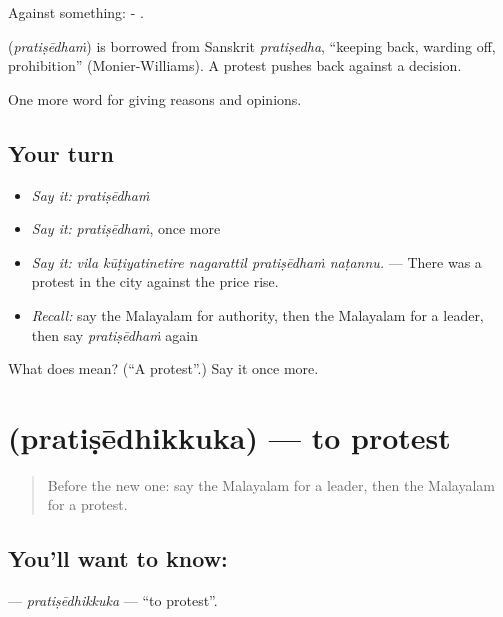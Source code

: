 Against something: -  .

\begin{cousinweb}
\textbf{} (\emph{pratiṣēdhaṁ}) is borrowed from Sanskrit \emph{pratiṣedha}, \textquotedblleft{}keeping back, warding off, prohibition\textquotedblright{} (Monier-Williams). A protest pushes back against a decision.
\end{cousinweb}

\begin{grammarlens}[title={What you've built}]
One more word for giving reasons and opinions.
\end{grammarlens}

\subsection*{Your turn}
\begin{itemize}
\raggedright
  \item \emph{Say it:} \emph{pratiṣēdhaṁ}
  \item \emph{Say it:} \emph{pratiṣēdhaṁ}, once more
  \item \emph{Say it:} \emph{vila kūṭiyatinetire nagarattil pratiṣēdhaṁ naṭannu.} — There was a protest in the city against the price rise.
  \item \emph{Recall:} say the Malayalam for authority, then the Malayalam for a leader, then say \emph{pratiṣēdhaṁ} again
\end{itemize}

\begin{tcolorbox}[breakable,colback=teal!4,colframe=teal!35!black,title={Before you move on}]
What does  mean? (\textquotedblleft{}A protest\textquotedblright{}.) Say it once more.
\end{tcolorbox}
\section[\texorpdfstring{\ml{പ്രതിഷേധിക്കുക} (pratiṣēdhikkuka)}{പ്രതിഷേധിക്കുക (pratiṣēdhikkuka)}]{ (pratiṣēdhikkuka) — to protest}

\label{lesson:ML-C425-pratisedhikkuka}



\begin{quote}
Before the new one: say the Malayalam for a leader, then the Malayalam for a protest.
\end{quote}

\subsection*{You'll want to know: }
\textbf{} — \emph{pratiṣēdhikkuka} — \textquotedblleft{}to protest\textquotedblright{}.

